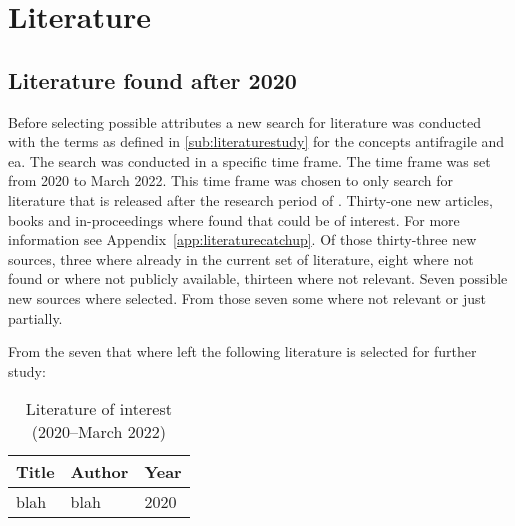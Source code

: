 \chapter{Literature}

\section{Literature found after 2020}
\label{sec:literaturefoundafter2020}
Before selecting possible attributes a new search for literature was conducted with the terms as defined in \cref{sub:literaturestudy} for the concepts \gls{antifragile} and \acrshort{ea}. The search was conducted in a specific time frame. The time frame was set from 2020 to March 2022. This time frame was chosen to only search for literature that is released after the research period of \textcite{Botjes2020}. Thirty-one new articles, books and in-proceedings where found that could be of interest. For more information see Appendix~\ref{app:literaturecatchup}. Of those thirty-three new sources, three where already in the current set of literature, eight where not found or where not publicly available, thirteen where not relevant. Seven possible new sources where selected. From those seven some where not relevant or just partially.

From the seven that where left the following literature is selected for further study:

\begin{table}[H]
	\centering
	\begin{tabular}{p{}p{}p{}}
		\toprule%
		\textbf{Title} & \textbf{Author} & \textbf{Year} \\
		\midrule %
		blah & blah & 2020 \\%
		\bottomrule
	\end{tabular}
	\caption[Literature of interest (2020--March 2022)]{Literature of interest (2020--March 2022)}
	\label{tab:literatureafter2020}
\end{table}
